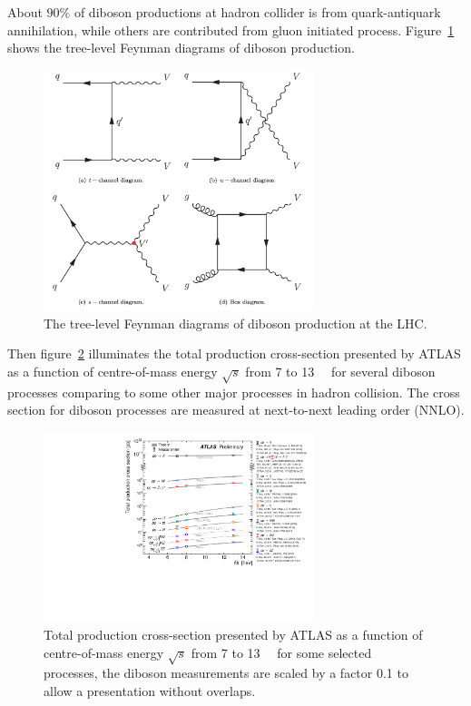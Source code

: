 About $90\%$ of diboson productions at hadron collider is from quark-antiquark annihilation,
while others are contributed from gluon initiated process.
Figure~\ref{fig:diboson_fd1} shows the tree-level Feynman diagrams of diboson production.
\begin{figure}[!htb]
  \centering
  \includegraphics[width=0.7\textwidth]{figures/Theory/diboson_prod_fey.png}
  \caption{The tree-level Feynman diagrams of diboson production at the LHC.}
  \label{fig:diboson_fd1}
\end{figure}
Then figure~\ref{fig:diboson_xs1} illuminates the total production cross-section presented by ATLAS
as a function of centre-of-mass energy $\sqrt{s}$ from 7 to 13~\tev~ for several diboson processes comparing 
to some other major processes in hadron collision.
The cross section for diboson processes are measured at next-to-next leading order (NNLO). 
\begin{figure}[!htb]
  \centering
  \includegraphics[width=0.7\textwidth]{figures/Theory/ATLAS_n_SMSummary_SqrtS.pdf}
  \caption{Total production cross-section presented by ATLAS as a function of centre-of-mass energy $\sqrt{s}$ from 7 to 13~\tev~ for some selected processes,
	   the diboson measurements are scaled by a factor 0.1 to allow a presentation without overlaps.}
  \label{fig:diboson_xs1}
\end{figure}

